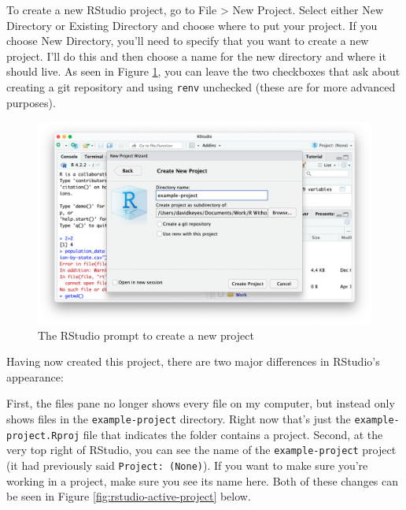 \documentclass[
]{book}
\begin{document}
To create a new RStudio project, go to File \textgreater{} New Project. Select either New Directory or Existing Directory and choose where to put your project. If you choose New Directory, you'll need to specify that you want to create a new project. I'll do this and then choose a name for the new directory and where it should live. As seen in Figure \ref{fig:create-new-project}, you can leave the two checkboxes that ask about creating a git repository and using \texttt{renv} unchecked (these are for more advanced purposes).

\begin{figure}
\includegraphics[width=1\linewidth]{assets/create-new-project} \caption{The RStudio prompt to create a new project}\label{fig:create-new-project}
\end{figure}

Having now created this project, there are two major differences in RStudio's appearance:

First, the files pane no longer shows every file on my computer, but instead only shows files in the \texttt{example-project} directory. Right now that's just the \texttt{example-project.Rproj} file that indicates the folder contains a project. Second, at the very top right of RStudio, you can see the name of the \texttt{example-project} project (it had previously said \texttt{Project:\ (None)}). If you want to make sure you're working in a project, make sure you see its name here. Both of these changes can be seen in Figure \ref{fig:rstudio-active-project} below.
\end{document}
